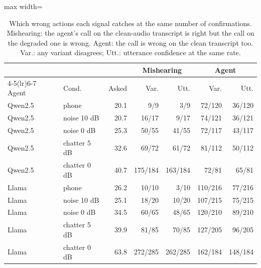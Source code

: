 \begin{table}[t]\centering\small\setlength{\tabcolsep}{4pt}
\begin{adjustbox}{max width=\linewidth}\begin{tabular}{llrrrrr}\toprule
 & & & \multicolumn{2}{c}{Mishearing} & \multicolumn{2}{c}{Agent} \\ \cmidrule(lr){4-5}\cmidrule(lr){6-7}
Agent & Cond. & Asked & Var. & Utt. & Var. & Utt. \\ \midrule
Qwen2.5 & phone & 20.1 & 9/9 & 3/9 & 72/120 & 36/120 \\
Qwen2.5 & noise 10 dB & 20.7 & 16/17 & 9/17 & 74/121 & 36/121 \\
Qwen2.5 & noise 0 dB & 25.3 & 50/55 & 41/55 & 72/117 & 43/117 \\
Qwen2.5 & chatter 5 dB & 32.6 & 69/72 & 61/72 & 81/112 & 50/112 \\
Qwen2.5 & chatter 0 dB & 40.7 & 175/184 & 163/184 & 72/81 & 65/81 \\
\midrule
Llama & phone & 26.2 & 10/10 & 3/10 & 110/216 & 77/216 \\
Llama & noise 10 dB & 25.1 & 18/20 & 10/20 & 107/215 & 75/215 \\
Llama & noise 0 dB & 34.5 & 60/65 & 48/65 & 120/210 & 89/210 \\
Llama & chatter 5 dB & 39.9 & 81/85 & 70/85 & 127/205 & 96/205 \\
Llama & chatter 0 dB & 63.8 & 272/285 & 262/285 & 162/184 & 148/184 \\
\bottomrule\end{tabular}\end{adjustbox}
\caption{Which wrong actions each signal catches at the same number of confirmations. Mishearing: the agent's call on the clean-audio transcript is right but the call on the degraded one is wrong. Agent: the call is wrong on the clean transcript too. Var.: any variant disagrees; Utt.: utterance confidence at the same rate.}\label{tab:catch}
\end{table}

